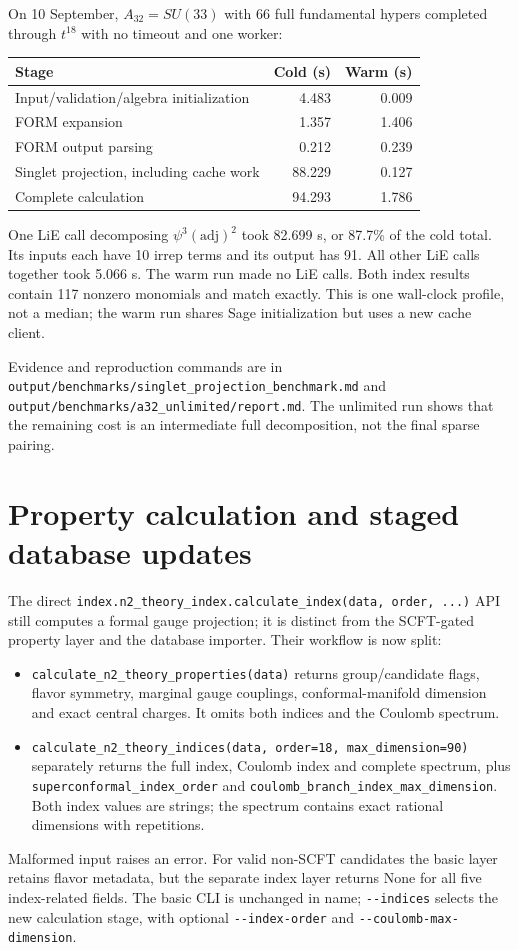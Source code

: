 \documentclass[11pt,a4paper]{article}
\newcommand{\code}[1]{{\small\nolinkurl{#1}}}
\newcommand{\adj}{\mathrm{adj}}
\begin{document}
On 10 September, $A_{32}=SU(33)$ with 66 full fundamental hypers completed through
$t^{18}$ with no timeout and one worker:
\begin{center}\begin{tabular}{lrr}
\toprule Stage & Cold (s) & Warm (s)\\\midrule
Input/validation/algebra initialization & 4.483 & 0.009\\
FORM expansion & 1.357 & 1.406\\
FORM output parsing & 0.212 & 0.239\\
Singlet projection, including cache work & 88.229 & 0.127\\
Complete calculation & 94.293 & 1.786\\\bottomrule
\end{tabular}\end{center}
One LiE call decomposing $\psi^3(\adj)^2$ took 82.699 s, or 87.7\% of the cold
total. Its inputs each have 10 irrep terms and its output has 91. All other LiE
calls together took 5.066 s. The warm run made no LiE calls. Both index results
contain 117 nonzero monomials and match exactly. This is one wall-clock profile,
not a median; the warm run shares Sage initialization but uses a new cache client.

Evidence and reproduction commands are in
\code{output/benchmarks/singlet_projection_benchmark.md} and
\code{output/benchmarks/a32_unlimited/report.md}. The unlimited run shows that the
remaining cost is an intermediate full decomposition, not the final sparse pairing.



\clearpage
\section{Property calculation and staged database updates}\label{sec:propertydb}
The direct \code{index.n2_theory_index.calculate_index(data, order, ...)} API
still computes a formal gauge projection; it is distinct from the SCFT-gated
property layer and the database importer. Their workflow is now split:
\begin{itemize}
\item \code{calculate_n2_theory_properties(data)} returns group/candidate flags,
flavor symmetry, marginal gauge couplings, conformal-manifold dimension and
exact central charges. It omits both indices and the Coulomb spectrum.
\item \code{calculate_n2_theory_indices(data, order=18, max_dimension=90)}
separately returns the full index, Coulomb index and complete spectrum, plus
\code{superconformal_index_order} and
\code{coulomb_branch_index_max_dimension}. Both index values are strings;
the spectrum contains exact rational dimensions with repetitions.
\end{itemize}
Malformed input raises an error. For valid non-SCFT candidates the basic layer
retains flavor metadata, but the separate index layer returns None for all
five index-related fields. The basic CLI is unchanged in name; \code{--indices}
selects the new calculation stage, with optional \code{--index-order} and
\code{--coulomb-max-dimension}.
\end{document}
